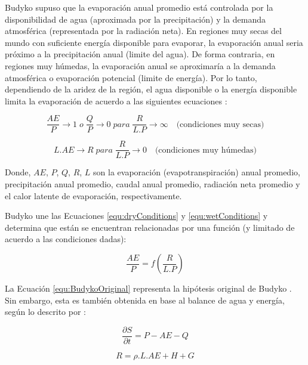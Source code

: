 \documentclass[12pt]{article}
\begin{document}
Budyko supuso que la evaporación anual promedio está controlada por la disponibilidad de agua (aproximada por la precipitación) y la demanda atmosférica (representada por la radiación neta). En regiones muy secas del mundo con suficiente energía disponible para evaporar, la evaporación anual seria próximo a la precipitación anual (limite del agua). De forma contraria, en regiones muy húmedas, la evaporación anual se aproximaría a la demanda atmosférica o evaporación potencial (limite de energía). Por lo tanto, dependiendo de la aridez de la región, el agua disponible o la energía disponible limita la evaporación de acuerdo a las siguientes ecuaciones \citep{budyko1958heat}:

\begin{equation}
 \frac{AE}{P} \rightarrow 1 \; o \; \frac{Q}{P} \rightarrow 0 \;para\; \frac{R}{L.P} \rightarrow \infty \quad \text{(condiciones muy secas)}
\label{equ:dryConditions}
\end{equation}

\begin{equation}
L.AE \rightarrow R \;para\; \frac{R}{L.P} \rightarrow 0 \quad \text{(condiciones muy húmedas)}
\label{equ:wetConditions}
\end{equation}

Donde, $AE$, $P$, $Q$, $R$, $L$ son la evaporación (evapotranspiración) anual promedio, precipitación anual promedio, caudal anual promedio, radiación neta promedio y el calor latente de evaporación, respectivamente.

\clearpage
Budyko une las Ecuaciones \ref{equ:dryConditions} y \ref{equ:wetConditions} y determina que están se encuentran relacionadas por una función (y limitado de acuerdo a las condiciones dadas):

\begin{equation}
\frac{AE}{P} = f\left ( \frac{R}{L.P} \right ) 
\label{equ:BudykoOriginal}
\end{equation}

La Ecuación \ref{equ:BudykoOriginal} representa la hipótesis original de Budyko \citep{budyko1958heat}. Sin embargo, esta es también obtenida en base al balance de agua y energía, según lo descrito por \citet{arora2002use}:

\begin{equation}
\frac{\partial S}{\partial t} = P - AE - Q
\label{equ:waterBalance}
\end{equation}

\begin{equation}
R  = \rho .L.AE + H + G
\label{equ:energyBalance}
\end{equation}
\end{document}
